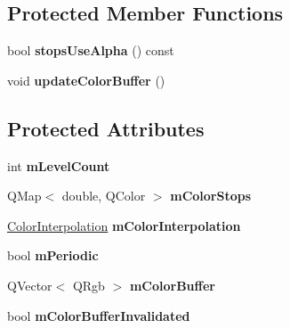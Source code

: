 \subsection*{Protected Member Functions}
\begin{DoxyCompactItemize}
\item 
bool {\bfseries stops\+Use\+Alpha} () const \hypertarget{classQCPColorGradient_a0eee10f4daef2cce01f0832d36cd1a8d}{}\label{classQCPColorGradient_a0eee10f4daef2cce01f0832d36cd1a8d}

\item 
void {\bfseries update\+Color\+Buffer} ()\hypertarget{classQCPColorGradient_a353f15ab3ab586eebf1f6b58c3e2707b}{}\label{classQCPColorGradient_a353f15ab3ab586eebf1f6b58c3e2707b}

\end{DoxyCompactItemize}
\subsection*{Protected Attributes}
\begin{DoxyCompactItemize}
\item 
int {\bfseries m\+Level\+Count}\hypertarget{classQCPColorGradient_a98fb68e359904b2c991fcae3e38a211a}{}\label{classQCPColorGradient_a98fb68e359904b2c991fcae3e38a211a}

\item 
Q\+Map$<$ double, Q\+Color $>$ {\bfseries m\+Color\+Stops}\hypertarget{classQCPColorGradient_a9e11a2b0974ef289d12c324822bc3a3e}{}\label{classQCPColorGradient_a9e11a2b0974ef289d12c324822bc3a3e}

\item 
\hyperlink{classQCPColorGradient_ac5dca17cc24336e6ca176610e7f77fc1}{Color\+Interpolation} {\bfseries m\+Color\+Interpolation}\hypertarget{classQCPColorGradient_a028cef73d863800a9ee93ffd641cce01}{}\label{classQCPColorGradient_a028cef73d863800a9ee93ffd641cce01}

\item 
bool {\bfseries m\+Periodic}\hypertarget{classQCPColorGradient_a4b07deeb20ca1ee2d5ea7e01bf0420af}{}\label{classQCPColorGradient_a4b07deeb20ca1ee2d5ea7e01bf0420af}

\item 
Q\+Vector$<$ Q\+Rgb $>$ {\bfseries m\+Color\+Buffer}\hypertarget{classQCPColorGradient_af8b5f0739faa5f8295154d47ce38ecff}{}\label{classQCPColorGradient_af8b5f0739faa5f8295154d47ce38ecff}

\item 
bool {\bfseries m\+Color\+Buffer\+Invalidated}\hypertarget{classQCPColorGradient_abacf55e11f67d6722a687af1bb2687bd}{}\label{classQCPColorGradient_abacf55e11f67d6722a687af1bb2687bd}

\end{DoxyCompactItemize}


